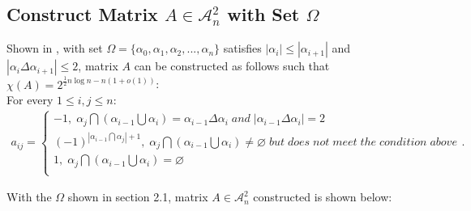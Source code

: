 \documentclass[11pt]{article}
\begin{document}
\subsection{Construct Matrix $A \in \mathcal{A}_n^2$ with Set $\Omega$}
Shown in \cite{ALON1997133}, with set $\Omega = \{\alpha_0, \alpha_1, \alpha_2, ..., \alpha_n\}$ satisfies $|\alpha_i| \leq |\alpha_{i+1}|$ and $|\alpha_i \Delta \alpha_{i+1}| \leq 2$, matrix $A$ can be constructed as follows such that $\chi(A)=2^{\frac{1}{2}n\log n-n(1+o(1))}$:\\
For every $1 \leq i,j \leq n$:
\begin{align*}
    a_{ij} = 
    \begin{cases}
    -1,\;\alpha_j\bigcap(\alpha_{i-1}\bigcup\alpha_i)=\alpha_{i-1}\Delta\alpha_{i}\;and\;|\alpha_{i-1}\Delta\alpha_{i}|=2 \\
    (-1)^{|\alpha_{i-1}\bigcap\alpha_j| + 1},\;\alpha_{j}\bigcap(\alpha_{i-1}\bigcup\alpha_{i})\neq\varnothing\;but\;does\;not\;meet\;the\;condition\;above \\
    1,\;\alpha_j\bigcap(\alpha_{i-1}\bigcup\alpha_i)=\varnothing \\
    \end{cases}.
\end{align*}

With the $\Omega$ shown in section 2.1, matrix $A \in \mathcal{A}_n^2$ constructed is shown below:
\end{document}
